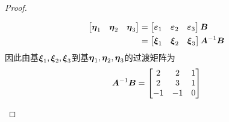 \begin{proof}
\begin{enumerate}
{              \begin{align*}
                  \begin{bmatrix}\boldsymbol{\eta}_1&\boldsymbol{\eta}_2&\boldsymbol{\eta}_3\end{bmatrix}
                   & =
                  \begin{bmatrix}\boldsymbol{\varepsilon}_1&\boldsymbol{\varepsilon}_2&\boldsymbol{\varepsilon}_3\end{bmatrix}\boldsymbol{B}                \\
                   & =\begin{bmatrix}\boldsymbol{\xi}_1&\boldsymbol{\xi}_2&\boldsymbol{\xi}_3\end{bmatrix}{\boldsymbol{A}}^{-1}\boldsymbol{B}
              \end{align*}
              因此由基\(\boldsymbol{\xi}_1,\boldsymbol{\xi}_2,\boldsymbol{\xi}_3\)到基\(\boldsymbol{\eta}_1,\boldsymbol{\eta}_2,\boldsymbol{\eta}_3\)的过渡矩阵为
              \begin{equation*}
                  {\boldsymbol{A}}^{-1}\boldsymbol{B}=
                  \begin{bmatrix}
                      2  & 2  & 1 \\
                      2  & 3  & 1 \\
                      -1 & -1 & 0
                  \end{bmatrix}
              \end{equation*}
              }
    \end{enumerate}
\end{proof}

